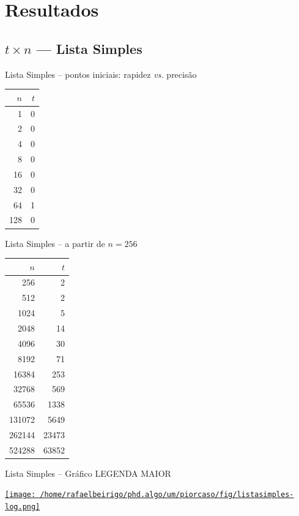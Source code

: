 \documentclass[bigger]{beamer}
\begin{document}
\section{Resultados}
\label{sec-3}
\subsection{$t \times n$ --- Lista Simples}
\label{sec-3-1}
\begin{frame}[label=sec-3-1-1]{Lista Simples -- pontos iniciais: rapidez \emph{vs.} precisão}
\begin{center}
\begin{tabular}{rr}
$n$ & $t$\\
\hline
1 & 0\\
2 & 0\\
4 & 0\\
8 & 0\\
16 & 0\\
32 & 0\\
64 & 1\\
128 & 0\\
\end{tabular}
\end{center}
\end{frame}
\begin{frame}[label=sec-3-1-2]{Lista Simples -- a partir de $n = 256$}
\begin{center}
\begin{tabular}{rr}
$n$ & $t$\\
\hline
256 & 2\\
512 & 2\\
1024 & 5\\
2048 & 14\\
4096 & 30\\
8192 & 71\\
16384 & 253\\
32768 & 569\\
65536 & 1338\\
131072 & 5649\\
262144 & 23473\\
524288 & 63852\\
\end{tabular}
\end{center}
\end{frame}
\begin{frame}[label=sec-3-1-3]{Lista Simples -- Gráfico LEGENDA MAIOR}
\begin{center}
\href{fig/listasimples-log.png}{\texttt{[image: /home/rafaelbeirigo/phd.algo/um/piorcaso/fig/listasimples-log.png]}}
\end{center}
\end{frame}
\end{document}
